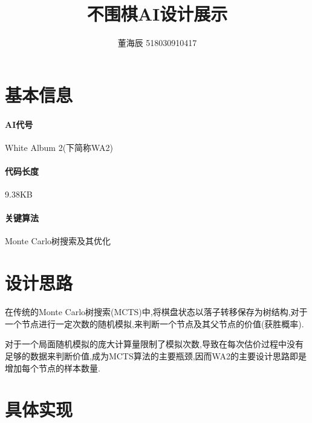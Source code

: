 \documentclass[UTF8]{article}
\title{不围棋AI设计展示}
\author{董海辰 518030910417}
\theoremstyle{definition}
\begin{document}
\maketitle

\tableofcontents
\newpage

\section{基本信息}

\paragraph{AI代号} White Album 2(下简称WA2)

\paragraph{代码长度} 9.38KB

\paragraph{关键算法} Monte Carlo树搜索及其优化

\section{设计思路}

在传统的Monte Carlo树搜索(MCTS)中,将棋盘状态以落子转移保存为树结构,对于一个节点进行一定次数的随机模拟,来判断一个节点及其父节点的价值(获胜概率).

对于一个局面随机模拟的庞大计算量限制了模拟次数,导致在每次估价过程中没有足够的数据来判断价值,成为MCTS算法的主要瓶颈,因而WA2的主要设计思路即是增加每个节点的样本数量.

\section{具体实现}
\end{document}
